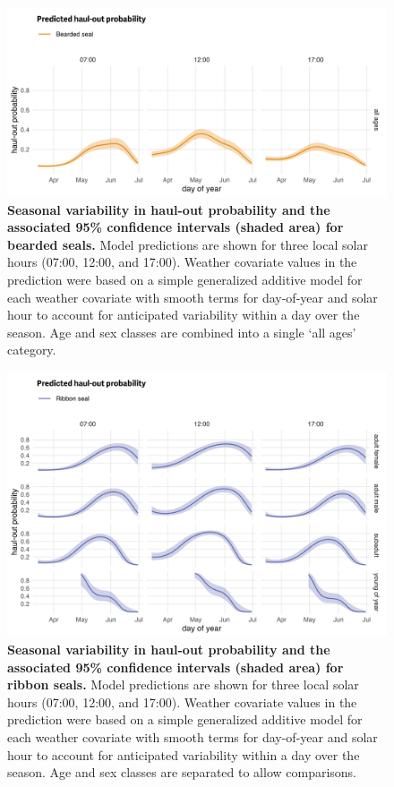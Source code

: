 \documentclass[fleqn,10pt,lineno]{wlpeerj} %
\begin{document}
\begin{figure}
\includegraphics[width=1\linewidth]{../figures/Figure-013} \caption{\textbf{Seasonal variability in haul-out probability and the associated 95\% confidence intervals (shaded area) for bearded seals.} \linebreak Model predictions are shown for three local solar hours (07:00, 12:00, and 17:00). Weather covariate values in the prediction were based on a simple generalized additive model for each weather covariate with smooth terms for day-of-year and solar hour to account for anticipated variability within a day over the season. Age and sex classes are combined into a single `all ages' category.}\label{fig:beardedPredSE}
\end{figure}



\begin{figure}
\includegraphics[width=1\linewidth]{../figures/Figure-014} \caption{\textbf{Seasonal variability in haul-out probability and the associated 95\% confidence intervals (shaded area) for ribbon seals.} \linebreak Model predictions are shown for three local solar hours (07:00, 12:00, and 17:00). Weather covariate values in the prediction were based on a simple generalized additive model for each weather covariate with smooth terms for day-of-year and solar hour to account for anticipated variability within a day over the season. Age and sex classes are separated to allow comparisons.}\label{fig:ribbonPredSE}
\end{figure}
\end{document}
